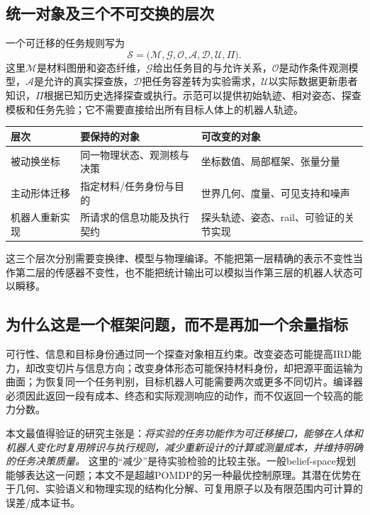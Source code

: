\documentclass[11pt,a4paper]{article}
\numberwithin{equation}{section}
\theoremstyle{definition}
\begin{document}
\subsection{统一对象及三个不可交换的层次}
一个可迁移的任务规则写为
\begin{equation}
 \mathcal S=\bigl(\mathcal M,\mathcal G,\mathcal O,\mathcal A,
       \mathcal D,\mathcal U,\Pi\bigr).
 \label{front:skill}
\end{equation}
这里$\mathcal M$是材料图册和姿态纤维，$\mathcal G$给出任务目的与允许关系，$\mathcal O$是动作条件观测模型，$\mathcal A$是允许的真实探查族，$\mathcal D$把任务容差转为实验需求，$\mathcal U$以实际数据更新患者知识，$\Pi$根据已知历史选择探查或执行。示范可以提供初始轨迹、相对姿态、探查模板和任务先验；它不需要直接给出所有目标人体上的机器人轨迹。

\begin{center}\small
\begin{tabularx}{\linewidth}{p{.16\linewidth}YY}
\toprule
层次 & 要保持的对象 & 可改变的对象\\\midrule
被动换坐标 & 同一物理状态、观测核与决策 & 坐标数值、局部框架、张量分量\\
主动形体迁移 & 指定材料/任务身份与目的 & 世界几何、度量、可见支持和噪声\\
机器人重新实现 & 所请求的信息功能及执行契约 & 探头轨迹、姿态、rail、可验证的关节实现\\\bottomrule
\end{tabularx}
\end{center}
这三个层次分别需要变换律、模型与物理编译。不能把第一层精确的表示不变性当作第二层的传感器不变性，也不能把统计输出可以模拟当作第三层的机器人状态可以瞬移。

\subsection{为什么这是一个框架问题，而不是再加一个余量指标}
可行性、信息和目标身份通过同一个探查对象相互约束。改变姿态可能提高IRD能力，却改变切片与信息方向；改变身体形态可能保持材料身份，却把源平面运输为曲面；为恢复同一个任务判别，目标机器人可能需要两次或更多不同切片。编译器必须因此返回一段有成本、终态和实际观测响应的动作，而不仅返回一个较高的能力分数。

本文最值得验证的研究主张是：\emph{将实验的任务功能作为可迁移接口，能够在人体和机器人变化时复用辨识与执行规则，减少重新设计的计算或测量成本，并维持明确的任务决策质量。} 这里的“减少”是待实验检验的比较主张。一般belief-space规划能够表达这一问题；本文不是超越POMDP的另一种最优控制原理。其潜在优势在于几何、实验语义和物理实现的结构化分解、可复用原子以及有限范围内可计算的误差/成本证书。
\end{document}
